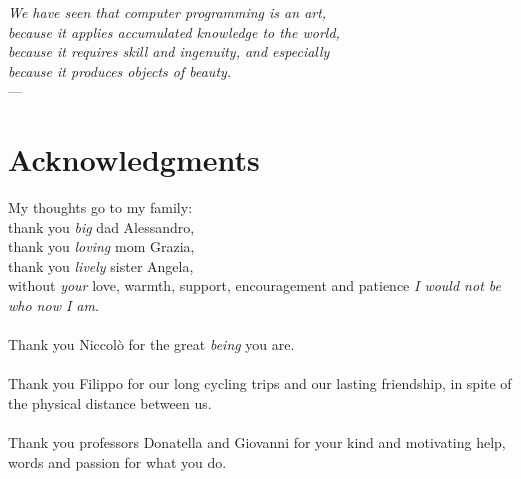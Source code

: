 
\begin{flushright}{\slshape    
    We have seen that computer programming is an art, \\ 
    because it applies accumulated knowledge to the world, \\ 
    because it requires skill and ingenuity, and especially \\
    because it produces objects of beauty.} \\ \medskip
    ---  \citep{knuth:1974}
\end{flushright}



\bigskip

\begingroup
\let\clearpage\relax
\let\cleardoublepage\relax
\let\cleardoublepage\relax

\chapter*{Acknowledgments}

My thoughts go to my family: \\
\indent thank you \emph{big} dad Alessandro, \\
\indent thank you \emph{loving} mom Grazia,\\
\indent thank you  \emph{lively} sister Angela, \\
without \emph{your} love, warmth, support, encouragement 
and patience \emph{I would not be who now I am}.
\\\\
Thank you Niccol\`o for the great \emph{being} you are.
\\\\
Thank you Filippo for our long cycling trips and our lasting
friendship, in spite of the physical distance between us.
\\\\
Thank you professors Donatella and Giovanni for your kind and motivating help,
words and passion for what you do.

